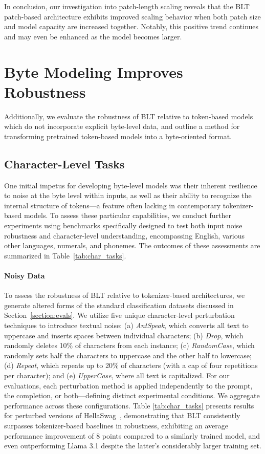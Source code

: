 In conclusion, our investigation into patch-length scaling reveals that the {\textsc BLT} patch-based architecture exhibits improved scaling behavior when both patch size and model capacity are increased together. Notably, this positive trend continues and may even be enhanced as the model becomes larger.

\section{Byte Modeling Improves Robustness} Additionally, we evaluate the robustness of {\textsc BLT} relative to token-based models which do not incorporate explicit byte-level data, and outline a method for transforming pretrained token-based models into a byte-oriented format.
\label{sec:robustness}

\subsection{Character-Level Tasks}

One initial impetus for developing byte-level models was their inherent resilience to noise at the byte level within inputs, as well as their ability to recognize the internal structure of tokens—a feature often lacking in contemporary tokenizer-based models. To assess these particular capabilities, we conduct further experiments using benchmarks specifically designed to test both input noise robustness and character-level understanding, encompassing English, various other languages, numerals, and phonemes. The outcomes of these assessments are summarized in Table~\ref{tab:char_tasks}.

\paragraph{Noisy Data} To assess the robustness of {\textsc BLT} relative to tokenizer-based architectures, we generate altered forms of the standard classification datasets discussed in Section~\ref{section:evals}. We utilize five unique character-level perturbation techniques to introduce textual noise: (a) \textit{AntSpeak}, which converts all text to uppercase and inserts spaces between individual characters; (b) \textit{Drop}, which randomly deletes 10\% of characters from each instance; (c) \textit{RandomCase}, which randomly sets half the characters to uppercase and the other half to lowercase; (d) \textit{Repeat}, which repeats up to 20\% of characters (with a cap of four repetitions per character); and (e) \textit{UpperCase}, where all text is capitalized. For our evaluations, each perturbation method is applied independently to the prompt, the completion, or both—defining distinct experimental conditions. We aggregate performance across these configurations. Table \ref{tab:char_tasks} presents results for perturbed versions of HellaSwag~\citep{Eval_hellaswag}, demonstrating that {\textsc BLT} consistently surpasses tokenizer-based baselines in robustness, exhibiting an average performance improvement of 8 points compared to a similarly trained model, and even outperforming Llama 3.1 despite the latter's considerably larger training set.

